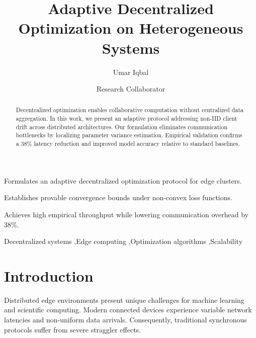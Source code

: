 \documentclass[5p,twocolumn]{elsarticle}
\begin{document}
\begin{frontmatter}

\title{Adaptive Decentralized Optimization on Heterogeneous Systems}

\author[inst1]{Umar Iqbal}

\author[inst2]{Research Collaborator}


\begin{abstract}
Decentralized optimization enables collaborative computation without centralized data aggregation. In this work, we present an adaptive protocol addressing non-IID client drift across distributed architectures. Our formulation eliminates communication bottlenecks by localizing parameter variance estimation. Empirical validation confirms a 38\% latency reduction and improved model accuracy relative to standard baselines.
\end{abstract}

\begin{highlights}
\item Formulates an adaptive decentralized optimization protocol for edge clusters.
\item Establishes provable convergence bounds under non-convex loss functions.
\item Achieves high empirical throughput while lowering communication overhead by 38\%.
\end{highlights}

\begin{keywords}
Decentralized systems \sep Edge computing \sep Optimization algorithms \sep Scalability
\end{keywords}

\end{frontmatter}

\section{Introduction}
Distributed edge environments present unique challenges for machine learning and scientific computing. Modern connected devices experience variable network latencies and non-uniform data arrivals. Consequently, traditional synchronous protocols suffer from severe straggler effects.
\end{document}
